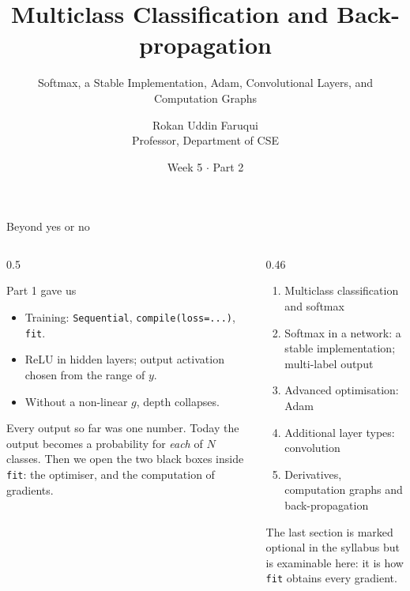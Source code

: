 \documentclass[aspectratio=169,10pt]{beamer}
\title[CSE 815 -- Week 5, Part 2]{Multiclass Classification and Back-propagation}
\subtitle{Softmax, a Stable Implementation, Adam, Convolutional Layers, and Computation Graphs}
\author{Rokan Uddin Faruqui\\ \small Professor, Department of CSE}
\institute{\small University of Chittagong \\ \texttt{rufaruqui@cu.ac.bd}}
\date[Week 5 / Part 2]{Week 5 $\cdot$ Part 2}
\begin{document}
\begin{frame}
  \titlepage
\end{frame}

\begin{frame}{Beyond yes or no}
  \begin{columns}[T,onlytextwidth]
    \begin{column}{0.5\textwidth}
      \begin{block}{Part 1 gave us}
        \footnotesize
        \begin{itemize}
          \item Training: \texttt{Sequential}, \texttt{compile(loss=...)}, \texttt{fit}.
          \item ReLU in hidden layers; output activation chosen from the range of $y$.
          \item Without a non-linear $g$, depth collapses.
        \end{itemize}
      \end{block}
      \footnotesize
      Every output so far was one number. Today the output becomes a probability for
      \emph{each} of $N$ classes. Then we open the two black boxes inside \texttt{fit}: the
      optimiser, and the computation of gradients.
    \end{column}
    \begin{column}{0.46\textwidth}
      \begin{keyidea}[Today]
        \footnotesize
        \begin{enumerate}
          \item Multiclass classification and softmax
          \item Softmax in a network: a stable implementation; multi-label output
          \item Advanced optimisation: Adam
          \item Additional layer types: convolution
          \item Derivatives, computation graphs and back-propagation
        \end{enumerate}
      \end{keyidea}
      \footnotesize The last section is marked optional in the syllabus but is examinable
      here: it is how \texttt{fit} obtains every gradient.
    \end{column}
  \end{columns}
\end{frame}
\end{document}
